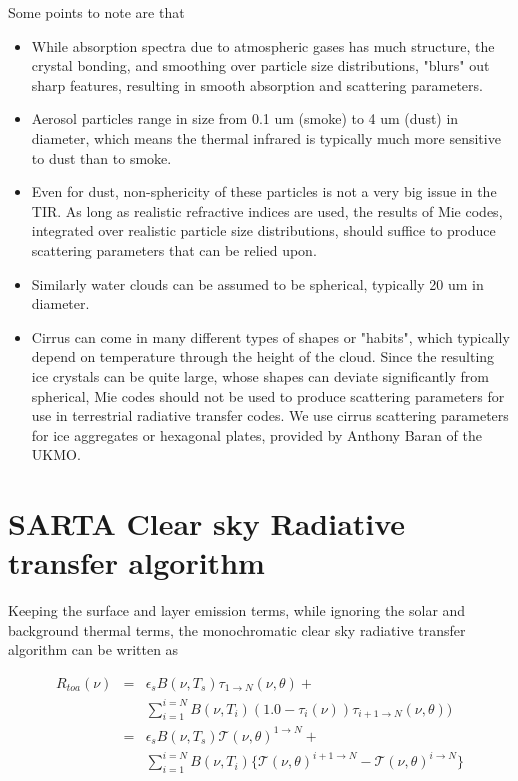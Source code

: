 \documentclass[11pt]{article}
\begin{document}
Some points to note are that
\begin{itemize}
  \item While absorption spectra due to atmospheric gases has much structure, the crystal
        bonding, and smoothing over particle size distributions, "blurs" out sharp features, resulting 
        in smooth absorption and scattering parameters.
  \item Aerosol particles range in size from 0.1 um (smoke) to 4 um (dust) in diameter, which means 
        the thermal infrared is typically much more sensitive to dust than to smoke.
  \item Even for dust, non-sphericity of these particles is not a very big issue in the TIR.
        As long as realistic refractive indices are used, the results of Mie codes, integrated over 
        realistic particle size distributions, should suffice to produce scattering parameters that can be
        relied upon.
  \item Similarly water clouds can be assumed to be spherical, typically 20 um in diameter.
  \item Cirrus can come in many different types of shapes or "habits", which typically
        depend on temperature through the height of the cloud. Since the resulting ice 
        crystals can be quite large, whose shapes can deviate significantly from spherical, Mie codes should
        not be used to produce scattering parameters for use in terrestrial radiative transfer codes. 
        We use cirrus scattering parameters for ice aggregates or hexagonal plates, provided by
        Anthony Baran of the UKMO.
\end{itemize}

\section{SARTA Clear sky Radiative transfer algorithm}

Keeping the surface and layer emission terms, while ignoring the solar and background thermal terms, 
the monochromatic clear sky radiative transfer algorithm can be written as

\begin{eqnarray*}
R_{toa}(\nu) & = & \epsilon_{s} B(\nu,T_{s}) \tau_{1 \rightarrow N}(\nu,\theta) + \\
             &   &  \sum_{i=1}^{i=N} B(\nu,T_{i})
                   (1.0 - \tau_{i}(\nu)) \tau_{i+1 \rightarrow N}(\nu,\theta)) \\
             & = & \epsilon_{s} B(\nu,T_{s}) \mathcal{T}(\nu,\theta)^{1 \rightarrow N} + \\
             &   &  \sum_{i=1}^{i=N} B(\nu,T_{i}) \{ \mathcal{T}(\nu,\theta)^{i+1\rightarrow N} - 
                                                     \mathcal{T}(\nu,\theta)^{i \rightarrow N} \}
\end{eqnarray*}
\end{document}
